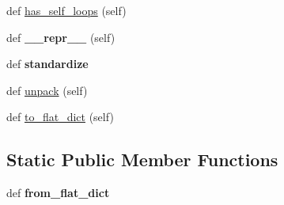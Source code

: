 \begin{DoxyCompactItemize}
\item 
def \mbox{\hyperlink{classppnp_1_1data_1_1sparsegraph_1_1SparseGraph_a37251710c9d18270cf3a2fdb8e24df22}{has\+\_\+self\+\_\+loops}} (self)
\item 
\mbox{\label{classppnp_1_1data_1_1sparsegraph_1_1SparseGraph_aa1e428949f42f8204b91424c40483810}} 
def {\bfseries \+\_\+\+\_\+repr\+\_\+\+\_\+} (self)
\item 
\mbox{\label{classppnp_1_1data_1_1sparsegraph_1_1SparseGraph_a88b078d63947de8b611844df6b6030b9}} 
def {\bfseries standardize}
\item 
def \mbox{\hyperlink{classppnp_1_1data_1_1sparsegraph_1_1SparseGraph_a99926aa314ef58104e923043c070def2}{unpack}} (self)
\item 
def \mbox{\hyperlink{classppnp_1_1data_1_1sparsegraph_1_1SparseGraph_afe63f5f08dd3f75cf73cdbd632439205}{to\+\_\+flat\+\_\+dict}} (self)
\end{DoxyCompactItemize}
\subsection*{Static Public Member Functions}
\begin{DoxyCompactItemize}
\item 
\mbox{\label{classppnp_1_1data_1_1sparsegraph_1_1SparseGraph_a34105084b50019ba2ba3fbe99c935f8c}} 
def {\bfseries from\+\_\+flat\+\_\+dict}
\end{DoxyCompactItemize}
